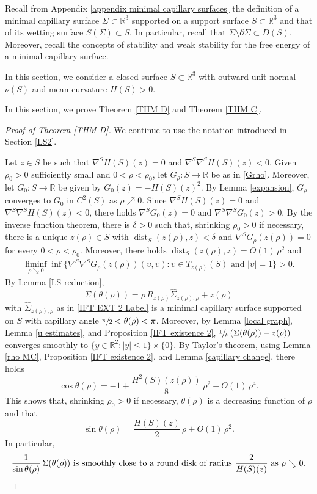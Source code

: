 \documentclass[11pt]{amsart}
\begin{document}
Recall from Appendix \ref{appendix minimal capillary surfaces}  the  definition of a minimal capillary surface $\Sigma \subset \mathbb{R}^3$ supported on a support surface $S\subset \mathbb{R}^3$  and that of its  wetting surface $S(\Sigma)\subset S$. In particular, recall that  $\Sigma\setminus \partial \Sigma \subset D(S)$.  Moreover, recall the concepts of  stability and weak stability for the free energy  of a minimal capillary surface.


In this section, we consider a closed surface $S\subset \mathbb{R}^3$ with outward unit normal $\nu(S)$ and mean curvature $H(S)>0$.

In this section, we prove Theorem \ref{THM D} and Theorem \ref{THM C}.


\begin{proof}[Proof of Theorem \ref{THM D}]
	We continue to use the notation introduced in Section \ref{LS2}.
	
	Let $z\in S$ be such that $\nabla^S H(S)(z)=0$ and $\nabla^S\nabla^SH(S)(z)<0$. Given $\rho_0>0$ sufficiently small and $0<\rho<\rho_0$, let ${G}_\rho: S\to \mathbb{R}$ be as in \eqref{Grho}. Moreover, let ${G}_0:S\to \mathbb{R}$ be given by ${G}_0(z)=-H(S)(z)^2$. 
	 By Lemma \ref{expansion}, $G_\rho$ converges to $G_0$ in $C^2(S)$ as $\rho\nearrow 0$. Since $\nabla^S H(S)(z)=0$ and $\nabla^S\nabla^SH(S)(z)<0$, there holds $\nabla^S G_0(z)=0$ and $\nabla^S\nabla^S G_0(z)>0$. By the inverse function theorem, there is $\delta>0$ such that, shrinking $\rho_0>0$ if necessary, there is a unique $z(\rho) \in S$  with $\operatorname{dist}_S(z(\rho),z)<\delta$ and $\nabla^S G_\rho(z(\rho))=0$ for every $0<\rho<\rho_0$. Moreover, there holds $\operatorname{dist}_S(z(\rho),z)=O(1)\,\rho^2$ and
	 \begin{align} \label{convexity}
	 	\liminf_{\rho\searrow 0}\inf\{\nabla^S\nabla^SG_\rho(z(\rho))(\upsilon,\upsilon):\upsilon\in T_{z(\rho)}(S)\text{ and }|\upsilon|=1\}>0.
	 \end{align}
	 By Lemma \ref{LS reduction}, $$\Sigma(\theta(\rho))=\rho\,R_{z(\rho)}\hat  \Sigma_{z(\rho),\rho}+z(\rho)$$
	 with $\hat  \Sigma_{z(\rho),\rho}$  as in \eqref{IFT EXT 2 Label} is a minimal capillary surface supported on $S$ with capillary angle $\sfrac{\pi}2<\theta(\rho)<\pi$.  Moreover, by  Lemma \ref{local graph}, Lemma \ref{u estimates}, and Proposition \ref{IFT existence 2}, $\sfrac{1}{\rho}\,(\Sigma(\theta(\rho))-z(\rho))$ converges smoothly to $\{y\in \mathbb{R}^2:|y|\leq 1\}\times\{0\}$. By Taylor's theorem, using Lemma \ref{rho MC}, Proposition \ref{IFT existence 2}, and Lemma \ref{capillary change}, there holds 
	$$
	\cos\theta(\rho)=-1+\frac{H^2(S)(z(\rho))}{8}\,\rho^2+O(1)\,\rho^4.
	$$
	This shows that, shrinking $\rho_0>0$ if necessary, $\theta(\rho)$ is a decreasing function of $\rho$ and that $$\sin\theta(\rho)=\frac{H(S)(z)}{2}\,\rho+O(1)\,\rho^2.$$
	In particular, 
	\begin{align} \label{smoothly close}
	\text{$
	\frac{1}{\sin\theta(\rho)}\,\Sigma(\theta(\rho))
	$
	is smoothly close to a round disk of radius $\frac{2}{H(S)(z)}$ as $\rho\searrow  0$.}
	\end{align} 
	

\end{proof}
\end{document}
